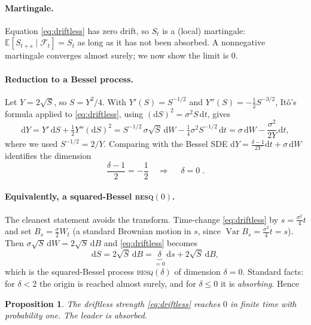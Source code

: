 \documentclass[11pt]{article}
\newtheorem{prop}{Proposition}
\newcommand{\dd}{\mathrm{d}}
\newcommand{\E}{\mathbb{E}}
\begin{document}
\paragraph{Martingale.} Equation \eqref{eq:driftless} has zero drift, so $S_t$ is a
(local) martingale: $\E[S_{t+s}\mid \mathcal F_t]=S_t$ as long as it has not been
absorbed. A nonnegative martingale converges almost surely; we now show the limit
is $0$.

\paragraph{Reduction to a Bessel process.} Let $Y=2\sqrt S$, so $S=Y^2/4$. With
$Y'(S)=S^{-1/2}$ and $Y''(S)=-\tfrac12 S^{-3/2}$, Itô's formula applied to
\eqref{eq:driftless}, using $(\dd S)^2=\sigma^2 S\,\dd t$, gives
\begin{equation}
\dd Y=Y'\,\dd S+\tfrac12Y''(\dd S)^2
 =S^{-1/2}\,\sigma\sqrt S\,\dd W-\tfrac14\sigma^2 S^{-1/2}\,\dd t
 =\sigma\,\dd W-\frac{\sigma^2}{2Y}\,\dd t,
\label{eq:bessel}
\end{equation}
where we used $S^{-1/2}=2/Y$. Comparing with the Bessel SDE
$\dd Y=\frac{\delta-1}{2Y}\dd t+\sigma\,\dd W$ identifies the dimension
\begin{equation}
\frac{\delta-1}{2}=-\frac12\quad\Longrightarrow\quad \boxed{\;\delta=0\;}.
\end{equation}

\paragraph{Equivalently, a squared-Bessel \textsc{besq}$(0)$.} The cleanest
statement avoids the transform. Time-change \eqref{eq:driftless} by
$s=\tfrac{\sigma^2}{4}t$ and set $B_s=\tfrac{\sigma}{2}W_t$ (a standard Brownian
motion in $s$, since $\operatorname{Var}B_s=\tfrac{\sigma^2}{4}t=s$). Then
$\sigma\sqrt S\,\dd W=2\sqrt S\,\dd B$ and \eqref{eq:driftless} becomes
\begin{equation}
\dd S=2\sqrt{S}\,\dd B=\underbrace{\delta}_{=0}\,\dd s+2\sqrt{S}\,\dd B,
\end{equation}
which is the squared-Bessel process \textsc{besq}$(\delta)$ of dimension
$\delta=0$. Standard facts: for $\delta<2$ the origin is reached almost surely,
and for $\delta\le0$ it is \emph{absorbing}. Hence

\begin{prop}\label{prop:hit}
The driftless strength \eqref{eq:driftless} reaches $0$ in finite time with
probability one. The leader is absorbed.
\end{prop}
\end{document}
